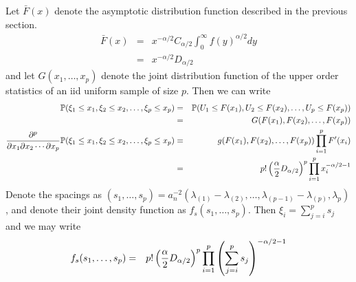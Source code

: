 \documentclass{article}
\begin{document}
Let $\bar{F}(x)$ denote the asymptotic distribution function described in the previous section.
\begin{eqnarray*}
  \bar{F}(x) &=& x^{-\alpha/2} C_{\alpha/2} \int_0^\infty f(y)^{\alpha/2} dy  \\
  &=& x^{-\alpha/2} D_{\alpha/2}
\end{eqnarray*}
and let $G(x_1, \dots, x_p)$ denote the joint distribution function of the upper order statistics of an iid
uniform sample of size $p$. Then we can write
\begin{eqnarray*}
\P(\xi_1 \leq x_1, \xi_2 \leq x_2, \dots, \xi_p \leq x_p) &=&
\P(U_1 \leq F(x_1), U_2 \leq F(x_2), \dots, U_p \leq F(x_p)) \\
  &=& G(F(x_1), F(x_2), \dots, F(x_p)) \\
\frac{\partial^p}{\partial x_1\partial x_2 \cdots \partial x_p}
\P(\xi_1 \leq x_1, \xi_2 \leq x_2, \dots, \xi_p \leq x_p) &=&
g(F(x_1), F(x_2), \dots, F(x_p)) \prod_{i=1}^p F'(x_i) \\
  &=& p! \left(
      {\alpha \over 2} D_{\alpha/2}
      \right)^p \prod_{i=1}^p x_i^{-\alpha/2 - 1}
\end{eqnarray*}
Denote the spacings as $(s_1, \dots, s_p) = a_n^{-2} (\lambda_{(1)} - \lambda_{(2)}, \dots,
\lambda_{(p-1)} - \lambda_{(p)}, \lambda_p)$, and denote their joint density function as
$f_s(s_1, \dots, s_p)$. Then $\xi_i = \sum_{j=i}^p s_j$ and we may write
\begin{eqnarray*}
  f_s(s_1, \dots, s_p) &=& p! \left(
      {\alpha \over 2} D_{\alpha/2}
      \right)^p \prod_{i=1}^p \left(
                           \sum_{j=i}^p s_j
                           \right)^{-\alpha/2 - 1}
\end{eqnarray*}


\end{document}
